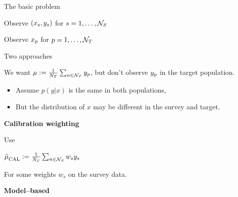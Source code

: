 \begin{frame}{The basic problem}
\begin{minipage}{0.45\textwidth}
    \centering
    Observe $(x_s, y_s)$ for $s = 1, \ldots, \mathcal{N}_{S}$\\
\end{minipage}
\begin{minipage}{0.45\textwidth}
    \centering
    Observe $x_p$ for $p = 1, \ldots, \mathcal{N}_{T}$\\
\end{minipage}


%
\end{frame}


\begin{frame}{Two approaches}

We want $\mu := \frac{1}{N_{T}} \sum_{n \in \mathcal{N}_{T}} y_p$, but don't observe $y_p$ in the target population.

\begin{itemize}
    \item Assume $p(y | x)$ is the same in both populations,
    \item But the distribution of $x$ may be different in the survey and target.
\end{itemize}
%

\begin{minipage}{0.45\textwidth}
    \centering
    \textbf{Calibration weighting}

    Use

    $\hat{\mu}^{}_{\mathrm{CAL}} := \frac{1}{N_{S}} \sum_{n \in \mathcal{N}_{S}} w_s y_s$

    For some weights $w_s$ on the survey data.
\end{minipage}
\hfill\vrule\hfill
\begin{minipage}{0.45\textwidth}
    \centering
    \textbf{Model--based}
\end{minipage}

\end{frame}